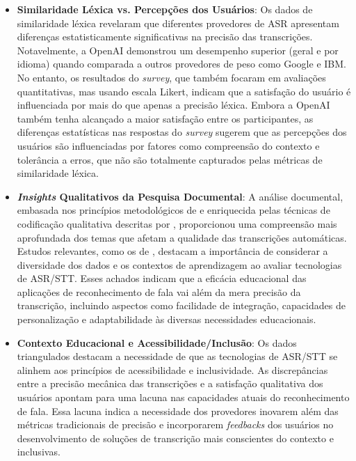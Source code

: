 \begin{itemize}

\item \textbf{Similaridade Léxica vs. Percepções dos Usuários}: Os dados de similaridade léxica revelaram que diferentes provedores de ASR apresentam diferenças estatisticamente significativas na precisão das transcrições. Notavelmente, a OpenAI demonstrou um desempenho superior (geral e por idioma) quando comparada a outros provedores de peso como Google e IBM. No entanto, os resultados do \textit{survey}, que também focaram em avaliações quantitativas, mas usando escala Likert, indicam que a satisfação do usuário é influenciada por mais do que apenas a precisão léxica. Embora a OpenAI também tenha alcançado a maior satisfação entre os participantes, as diferenças estatísticas nas respostas do \textit{survey} sugerem que as percepções dos usuários são influenciadas por fatores como compreensão do contexto e tolerância a erros, que não são totalmente capturados pelas métricas de similaridade léxica.

\item \textbf{\textit{Insights} Qualitativos da Pesquisa Documental}: A análise documental, embasada nos princípios metodológicos de  e enriquecida pelas técnicas de codificação qualitativa descritas por , proporcionou uma compreensão mais aprofundada dos temas que afetam a qualidade das transcrições automáticas. Estudos relevantes, como os de , destacam a importância de considerar a diversidade dos dados e os contextos de aprendizagem ao avaliar tecnologias de ASR/STT. Esses achados indicam que a eficácia educacional das aplicações de reconhecimento de fala vai além da mera precisão da transcrição, incluindo aspectos como facilidade de integração, capacidades de personalização e adaptabilidade às diversas necessidades educacionais.

\item \textbf{Contexto Educacional e Acessibilidade/Inclusão}: Os dados triangulados destacam a necessidade de que as tecnologias de ASR/STT se alinhem aos princípios de acessibilidade e inclusividade. As discrepâncias entre a precisão mecânica das transcrições e a satisfação qualitativa dos usuários apontam para uma lacuna nas capacidades atuais do reconhecimento de fala. Essa lacuna indica a necessidade dos provedores inovarem além das métricas tradicionais de precisão e incorporarem \textit{feedbacks} dos usuários no desenvolvimento de soluções de transcrição mais conscientes do contexto e inclusivas.

\end{itemize}


